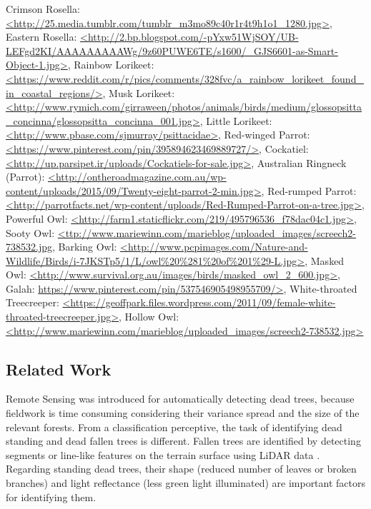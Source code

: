 \documentclass{subfiles}
\begin{document}
{{    	Crimson Rosella: \url{<http://25.media.tumblr.com/tumblr_m3mo89c40r1r4t9h1o1_1280.jpg>},
    	Eastern Rosella: \url{<http://2.bp.blogspot.com/-pYxw51WjSOY/UB-LEFgd2KI/AAAAAAAAAWg/9z60PUWE6TE/s1600/_GJS6601-as-Smart-Object-1.jpg>},
    	Rainbow Lorikeet: \url{<https://www.reddit.com/r/pics/comments/328fvc/a_rainbow_lorikeet_found_in_coastal_regions/>},     	Musk Lorikeet: \url{<http://www.rymich.com/girraween/photos/animals/birds/medium/glossopsitta_concinna/glossopsitta_concinna_001.jpg>},     	Little Lorikeet: \url{<http://www.pbase.com/sjmurray/psittacidae>},     	Red-winged Parrot: \url{<https://www.pinterest.com/pin/395894623469889727/>}, Cockatiel: \url{<http://up.parsipet.ir/uploads/Cockatiels-for-sale.jpg>},     	Australian Ringneck (Parrot): \url{<http://ontheroadmagazine.com.au/wp-content/uploads/2015/09/Twenty-eight-parrot-2-min.jpg>},     	Red-rumped Parrot: \url{<http://parrotfacts.net/wp-content/uploads/Red-Rumped-Parrot-on-a-tree.jpg>},     	Powerful Owl: \url{<http://farm1.staticflickr.com/219/495796536_f78dac04c1.jpg>},     	Sooty Owl: \url{<ttp://www.mariewinn.com/marieblog/uploaded_images/screech2-738532.jpg},     	Barking Owl: \url{<http://www.pcpimages.com/Nature-and-Wildlife/Birds/i-7JKSTp5/1/L/owl\%20\%281\%20of\%201\%29-L.jpg>},     	Masked Owl: \url{<http://www.survival.org.au/images/birds/masked_owl_2_600.jpg>},  	Galah: \url{https://www.pinterest.com/pin/537546905498955709/>},   	White-throated Treecreeper: \url{<https://geoffpark.files.wordpress.com/2011/09/female-white-throated-treecreeper.jpg>}, Hollow Owl: \url{<http://www.mariewinn.com/marieblog/uploaded_images/screech2-738532.jpg>} }
}





\subsection{Related Work}

\par Remote Sensing was introduced for automatically detecting dead trees, because fieldwork is time consuming considering their variance spread and the size of the relevant forests. From a classification perceptive, the task of identifying dead standing and dead fallen trees is different. Fallen trees are identified by detecting segments or line-like features on the terrain surface using LiDAR data \cite{Polewski2015} \cite{Mucke2013}. Regarding standing dead trees, their shape (reduced number of leaves or broken branches) \cite{Yao2012} and light reflectance (less green light illuminated) \cite{Pasher2009} are important factors for identifying them.
\end{document}
